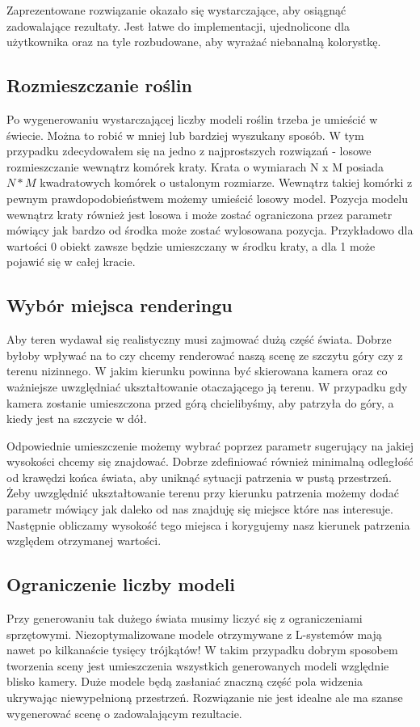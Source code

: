 \documentclass[inz,longabstract]{iithesis}
\begin{document}
            Zaprezentowane rozwiązanie okazało się wystarczające, aby osiągnąć zadowalające rezultaty. Jest łatwe do implementacji, ujednolicone dla użytkownika oraz na tyle rozbudowane, aby wyrażać niebanalną kolorystkę.
            
        \subsection{Rozmieszczanie roślin}
            Po wygenerowaniu wystarczającej liczby modeli roślin trzeba je umieścić w świecie. Można to robić w mniej lub bardziej wyszukany sposób. W tym przypadku zdecydowałem się na jedno z najprostszych rozwiązań - losowe rozmieszczanie wewnątrz komórek kraty. Krata o wymiarach N x M posiada $N * M$ kwadratowych komórek o ustalonym rozmiarze. Wewnątrz takiej komórki z pewnym prawdopodobieństwem możemy umieścić losowy model. Pozycja modelu wewnątrz kraty również jest losowa i może zostać ograniczona przez parametr mówiący jak bardzo od środka może zostać wylosowana pozycja. Przykładowo dla wartości 0 obiekt zawsze będzie umieszczany w środku kraty, a dla 1 może pojawić się w całej kracie. 
            
        \subsection{Wybór miejsca renderingu}
            Aby teren wydawał się realistyczny musi zajmować dużą część świata. Dobrze byłoby wpływać na to czy chcemy renderować naszą scenę ze szczytu góry czy z terenu nizinnego. W jakim kierunku powinna być skierowana kamera oraz co ważniejsze uwzględniać ukształtowanie otaczającego ją terenu. W przypadku gdy kamera zostanie umieszczona przed górą chcielibyśmy, aby patrzyła do góry, a kiedy jest na szczycie w dół. 
            
            Odpowiednie umieszczenie możemy wybrać poprzez parametr sugerujący na jakiej wysokości chcemy się znajdować. Dobrze zdefiniować również minimalną odległość od krawędzi końca świata, aby uniknąć sytuacji patrzenia w pustą przestrzeń. Żeby uwzględnić ukształtowanie terenu przy kierunku patrzenia możemy dodać parametr mówiący jak daleko od nas znajduję się miejsce które nas interesuje. Następnie obliczamy wysokość tego miejsca i korygujemy nasz kierunek patrzenia względem otrzymanej wartości.
            
        \subsection{Ograniczenie liczby modeli}
            Przy generowaniu tak dużego świata musimy liczyć się z ograniczeniami sprzętowymi. Niezoptymalizowane modele otrzymywane z L-systemów mają nawet po kilkanaście tysięcy trójkątów! W takim przypadku dobrym sposobem tworzenia sceny jest umieszczenia wszystkich generowanych modeli względnie blisko kamery. Duże modele będą zasłaniać znaczną część pola widzenia ukrywając niewypełnioną przestrzeń. Rozwiązanie nie jest idealne ale ma szanse wygenerować scenę o zadowalającym rezultacie.
            
\end{document}
